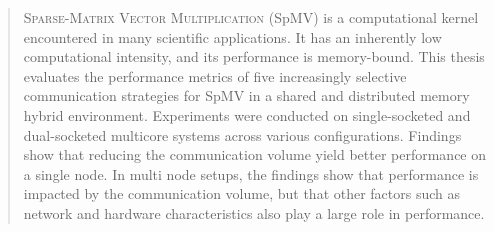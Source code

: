 \begin{abstract}
\textsc{Sparse-Matrix Vector Multiplication} (SpMV) is a computational kernel encountered in many scientific applications. It has an inherently low computational intensity, and its performance is memory-bound. This thesis evaluates the performance metrics of five increasingly selective communication strategies for SpMV in a shared and distributed memory hybrid environment. Experiments were conducted on single-socketed and dual-socketed multicore systems across various configurations. Findings show that reducing the communication volume yield better performance on a single node. In multi node setups, the findings show that performance is impacted by the communication volume, but that other factors such as network and hardware characteristics also play a large role in performance.







\end{abstract}
